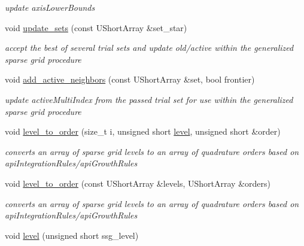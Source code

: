\begin{DoxyCompactItemize}
\begin{DoxyCompactList}\small\item\em update axis\+Lower\+Bounds \end{DoxyCompactList}\item 
void \hyperlink{classPecos_1_1SparseGridDriver_ab1c5960af8466c6878fe3c35996c0ae3}{update\+\_\+sets} (const U\+Short\+Array \&set\+\_\+star)\label{classPecos_1_1SparseGridDriver_ab1c5960af8466c6878fe3c35996c0ae3}

\begin{DoxyCompactList}\small\item\em accept the best of several trial sets and update old/active within the generalized sparse grid procedure \end{DoxyCompactList}\item 
void \hyperlink{classPecos_1_1SparseGridDriver_a8aa57b7d7a0e594ddbd34435de61161d}{add\+\_\+active\+\_\+neighbors} (const U\+Short\+Array \&set, bool frontier)\label{classPecos_1_1SparseGridDriver_a8aa57b7d7a0e594ddbd34435de61161d}

\begin{DoxyCompactList}\small\item\em update active\+Multi\+Index from the passed trial set for use within the generalized sparse grid procedure \end{DoxyCompactList}\item 
void \hyperlink{classPecos_1_1SparseGridDriver_a951a6d097c1d39cdc1fd60660a5252f7}{level\+\_\+to\+\_\+order} (size\+\_\+t i, unsigned short \hyperlink{classPecos_1_1SparseGridDriver_ab3075bdfb04432d86fb8376e9414ed4a}{level}, unsigned short \&order)\label{classPecos_1_1SparseGridDriver_a951a6d097c1d39cdc1fd60660a5252f7}

\begin{DoxyCompactList}\small\item\em converts an array of sparse grid levels to an array of quadrature orders based on api\+Integration\+Rules/api\+Growth\+Rules \end{DoxyCompactList}\item 
void \hyperlink{classPecos_1_1SparseGridDriver_aa0449fb598df7ed518b5ae1010dfd5df}{level\+\_\+to\+\_\+order} (const U\+Short\+Array \&levels, U\+Short\+Array \&orders)\label{classPecos_1_1SparseGridDriver_aa0449fb598df7ed518b5ae1010dfd5df}

\begin{DoxyCompactList}\small\item\em converts an array of sparse grid levels to an array of quadrature orders based on api\+Integration\+Rules/api\+Growth\+Rules \end{DoxyCompactList}\item 
void \hyperlink{classPecos_1_1SparseGridDriver_ab3075bdfb04432d86fb8376e9414ed4a}{level} (unsigned short ssg\+\_\+level)\label{classPecos_1_1SparseGridDriver_ab3075bdfb04432d86fb8376e9414ed4a}


\end{DoxyCompactItemize}
